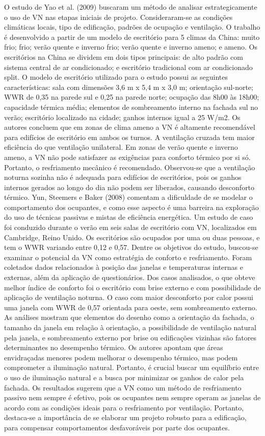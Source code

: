 \documentclass[brazil,hardcopy,openany,a5paper]{ufscthesis}
\begin{document}
	O estudo de Yao et al. (2009) buscaram um método de analisar estrategicamente o uso de VN nas etapas iniciais de projeto. Consideraram-se
	as condições climáticas locais, tipo de edificação, padrões de ocupação e ventilação. O trabalho é desenvolvido a partir de um modelo de escritório para 5 climas da China: muito frio; frio; verão quente e inverno frio; verão quente e inverno ameno; e ameno. Os escritórios na China se dividem em dois tipos principais: de alto padrão com sistema central de ar condicionado; e escritório tradicional com ar condicionado split. O modelo de escritório utilizado para o estudo possui as seguintes características: sala com dimensões 3,6 m x 5,4 m x 3,0 m; orientação sul-norte; WWR de 0,35 na parede sul e 0,25 na parede norte; ocupação das 8h00 às 18h00; capacidade térmica média; elementos de sombreamento interno na fachada sul no verão; escritório localizado na cidade; ganhos internos igual a 25 W/m2. Os autores concluem que em zonas de clima ameno a VN é altamente recomendável para edifícios de escritório em ambos os turnos. A ventilação cruzada tem maior eficiência do que ventilação unilateral.
	Em zonas de verão quente e inverno ameno, a VN não pode satisfazer as exigências para conforto térmico por si só. Portanto, o resfriamento mecânico é recomendado. Observou-se que a ventilação noturna sozinha não é adequada para edifícios de escritórios, pois os ganhos internos gerados ao longo do dia não podem ser liberados, causando desconforto térmico. Yun, Steemers e Baker (2008) comentam a dificuldade de se modelar o comportamento dos ocupantes, e como esse aspecto é uma barreira na exploração do uso de técnicas passivas e mistas de eficiência energética. Um estudo de caso foi conduzido durante o verão em seis salas de escritório com VN, localizados em Cambridge, Reino Unido. Os escritórios são ocupados por uma ou duas pessoas, e tem o WWR variando entre 0,12 e 0,57. Dentre os objetivos do estudo, buscou-se examinar o potencial da VN como estratégia de conforto e resfriamento. Foram coletados dados relacionados à posição das janelas e temperaturas internas e externas, além da aplicação de questionários.
	Dos casos analisados, o que obteve melhor índice de conforto foi o escritório com brise externo e com possibilidade de aplicação de ventilação noturna. O caso com maior desconforto por calor possui uma janela com WWR de 0,57 orientada para oeste, sem sombreamento externo. As análises mostram que elementos do desenho como a orientação da fachada, o tamanho da janela em relação à orientação, a possibilidade de ventilação natural pela janela, e sombreamento externo por brise ou edificações vizinhas são fatores determinantes no desempenho térmico. Os autores apontam que áreas envidraçadas menores podem melhorar o desempenho térmico, mas podem comprometer a iluminação natural. Portanto, é crucial buscar um equilíbrio entre o uso de iluminação natural e a busca por minimizar os ganhos de calor pela fachada. Os resultados sugerem que a VN como um método de resfriamento passivo nem sempre é efetivo, pois os ocupantes nem sempre operam as janelas de acordo com as condições ideais para o resfriamento por ventilação. Portanto, destaca-se a importância de se elaborar um projeto robusto para a edificação, para compensar comportamentos desfavoráveis por parte dos ocupantes.
\end{document}
